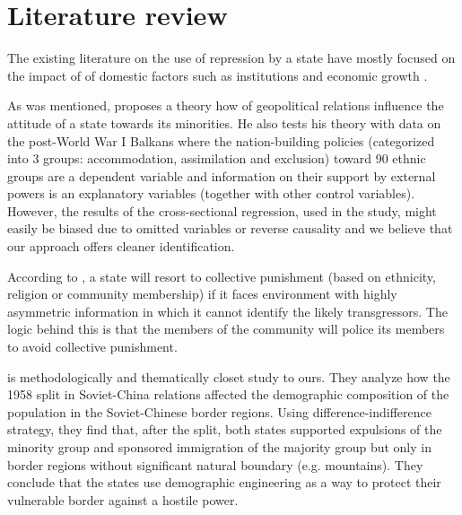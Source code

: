 \documentclass[11pt]{article}
\begin{document}







\section{Literature review}
The existing literature on the use of repression by a state have mostly focused on the impact of  of domestic factors such as institutions and economic growth \citep{davenport_state_2007-1}.

As was mentioned, \citet{mylonas_politics_2013} proposes a theory how of geopolitical relations influence the attitude of a state towards its minorities. He also tests his theory with data on the post-World War I Balkans where the nation-building policies (categorized into 3 groups: accommodation, assimilation and exclusion)  toward  90 ethnic groups are a dependent variable and information on their support by external powers is an explanatory variables (together with other control variables). However, the results of the cross-sectional regression, used in the study, might easily be biased due to omitted variables or reverse causality and we believe that our approach offers cleaner identification.

According to \citet{blaydes_state_2018}, a state will resort to collective punishment (based on ethnicity, religion or community membership) if it faces environment with highly asymmetric information in which it cannot identify the likely transgressors. The logic behind this is that the members of the community will police its members to avoid collective punishment. 

\citet{mcnamee_demographic_nodate} is methodologically and thematically closet study to ours. They analyze how the 1958 split in Soviet-China relations affected the demographic composition of the population in the Soviet-Chinese border regions.
Using difference-indifference strategy, they find that, after the split,  both states supported expulsions  of the minority group and sponsored immigration of the majority group but only in border regions without significant natural boundary (e.g. mountains). They conclude that the states use demographic engineering as a way to protect their vulnerable border against a hostile power. 
\end{document}
